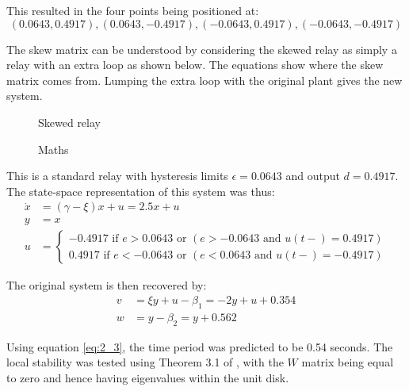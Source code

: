 \documentclass[a4paper, 12pt]{article}
\begin{document}
\begin{appendices}
This resulted in the four points being positioned at:
\begin{equation}
(0.0643,0.4917),(0.0643,-0.4917),(-0.0643,0.4917),(-0.0643,-0.4917)
\end{equation}

The skew matrix can be understood by considering the skewed relay as simply a relay with an extra loop as shown below. The equations show where the skew matrix comes from. Lumping the extra loop with the original plant gives the new system. 

\begin{figure}[h!]
\caption{Skewed relay}
\end{figure}
\begin{figure}[h!]
\caption{Maths}
\end{figure}

This is a standard relay with hysteresis limits $\epsilon = 0.0643$ and output $d = 0.4917$. The state-space representation of this system was thus:
\begin{align}
\dot{x} &= (\gamma-\xi)x + u = 2.5x + u \\
y &= x \\
u &= \begin{cases}
	               -0.4917 \text{ if } e > 0.0643 \text{ or } (e >-0.0643 \text{ and } u(t-) = 0.4917)\\
	                0.4917 \text{ if } e < -0.0643 \text{ or } (e < 0.0643 \text{ and } u(t-) = -0.4917)	              
	            \end{cases}
\end{align}

The original system is then recovered by:
\begin{align}
v&= \xi y + u - \beta_1 = -2y+u+0.354 \\
w&= y - \beta_2 = y + 0.562 
\end{align}

Using equation \ref{eq:2_3}, the time period was predicted to be 0.54 seconds. The local stability was tested using Theorem 3.1 of \cite{astrom1995}, with the $W$ matrix being equal to zero and hence having eigenvalues within the unit disk. 


\end{appendices}
\end{document}
